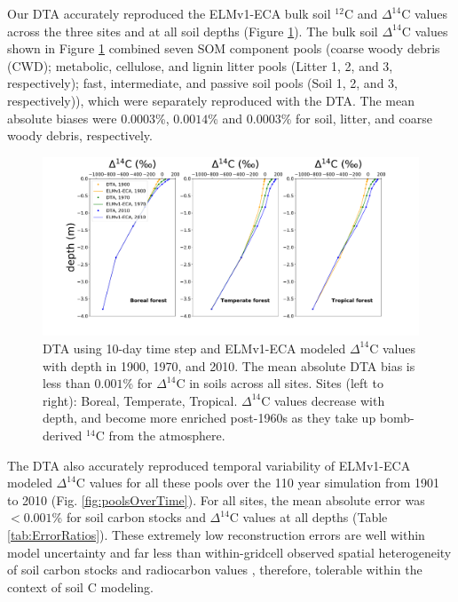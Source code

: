 \documentclass[draft]{agujournal2019}
\begin{document}
Our DTA accurately reproduced the ELMv1-ECA bulk soil  $^{12}$C and $\Delta^{14}$C values across the three sites and at all soil depths (Figure \ref{fig:depthProfiles}). The bulk soil $\Delta^{14}$C values shown in Figure \ref{fig:depthProfiles} combined seven SOM component pools (coarse woody debris (CWD); metabolic, cellulose, and lignin litter pools (Litter 1, 2, and 3, respectively); fast, intermediate, and passive soil pools (Soil 1, 2, and 3, respectively)), which were separately reproduced with the DTA. The mean absolute biases were $0.0003$\%, $0.0014$\% and $0.0003$\% for soil, litter, and coarse woody debris, respectively.

\begin{figure}[htbp]
        \centering 
        \includegraphics[width=1.1\linewidth]{figs/depth_profile_10.pdf}
        \caption{DTA using 10-day time step and ELMv1-ECA modeled $\Delta^{14}$C values with depth in 1900, 1970, and 2010. The mean absolute DTA bias is less than $0.001$\% for $\Delta^{14}$C in soils across all sites. Sites (left to right): Boreal, Temperate, Tropical. $\Delta^{14}$C values decrease with depth, and become more enriched post-1960s as they take up bomb-derived $^{14}$C from the atmosphere.
        \label{fig:depthProfiles}
        }
\end{figure}      
             

The DTA also accurately reproduced temporal variability of ELMv1-ECA modeled $\Delta^{14}$C values for all these pools over the 110 year simulation from 1901 to 2010 (Fig. \ref{fig:poolsOverTime}). For all sites, the mean absolute error was $<0.001$\% for soil carbon stocks and $\Delta^{14}$C values at all depths (Table \ref{tab:ErrorRatios}). These extremely low reconstruction errors are well within model uncertainty and far less than within-gridcell observed spatial heterogeneity of soil carbon stocks and radiocarbon values \cite{Chen2009JGR, Lawrence2019}, therefore, tolerable within the context of soil C modeling.
\end{document}

